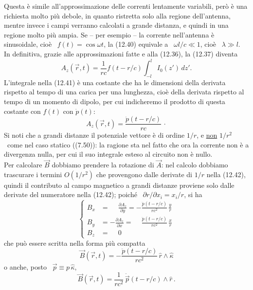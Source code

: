 Questa \`e simile all'approssimazione delle correnti lentamente variabili,
per\`o \`e una richiesta molto pi\`u debole, in quanto ristretta solo alla
regione dell'antenna, mentre invece i campi verranno calcolati a grande
distanza, e quindi in una regione molto pi\`u ampia. Se -- per esempio -- la
corrente nell'antenna \`e sinusoidale, cio\`e \ $f(t)=\cos\omega t$, la (12.40)
equivale a \ $\omega l/c\ll1$, cio\`e \ $\lambda\gg l$.\\
In definitiva, grazie alle approssimazioni fatte e alla (12.36), la (12.37)
diventa
\begin{equation}
  A_z(\vec r,t)=\frac{1}{rc}f(t-r/c)\int_{-l}^lI_0(z')\,dz'.
  \tag{12.41}
\end{equation}
L'integrale nella (12.41) \`e una costante che ha le dimensioni della derivata
rispetto al tempo di una carica per una lunghezza, cio\`e della derivata
rispetto al tempo di un momento di dipolo, per cui indicheremo il prodotto di
questa costante con $f(t)$ con $\dot p(t)$:
\begin{equation}
  A_z(\vec r,t)=\frac{\dot p(t-r/c)}{rc}\,\cdot
  \tag{12.42}
\end{equation}
Si noti che a grandi distanze il potenziale vettore \`e di ordine $1/r$, e
\underline{non} $1/r^2$ \ come nel caso statico \big((7.50)\big): la ragione sta
nel fatto che ora la corrente non \`e a divergenza nulla, per cui il suo
integrale esteso al circuito non \`e nullo.\\
Per calcolare $\vec B$ dobbiamo prendere la rotazione di $\vec A$: nel calcolo
dobbiamo trascurare i termini $O(1/r^2)$ che provengono dalle derivate di $1/r$
nella (12.42), quindi il contributo al campo magnetico a grandi distanze
proviene solo dalle derivate del numeratore nella (12.42); poich\'e
\ $\partial r/\partial x_i=x_i/r$, si ha
\begin{equation}
  \left\{\begin{aligned}
    B_x&=\phantom{-}\frac{\partial A_z}{\partial y}
    =-\frac{\ddot p(t-r/c)}{rc^2}\,\frac{y}{r}\\
    B_y&=-\frac{\partial A_z}{\partial x}
    =\phantom{-}\frac{\ddot p(t-r/c)}{rc^2}\,\frac{x}{r}\\
    B_z&=\phantom{-}0
  \end{aligned}\right.
  \tag{12.43}
\end{equation}
che pu\`o essere scritta nella forma pi\`u compatta
\[
  \vec B(\vec r,t)=-\frac{\ddot p(t-r/c)}{rc^2}\,\hat r\wedge\hat\kappa
\]
o anche, posto \ $\vec p\equiv p\,\hat\kappa$,
\begin{equation}
  \vec B(\vec r,t)=\frac{1}{rc^2}\,\ddot{\vec p}(t-r/c)\wedge\hat r\,.
  \tag{12.44}
\end{equation}
